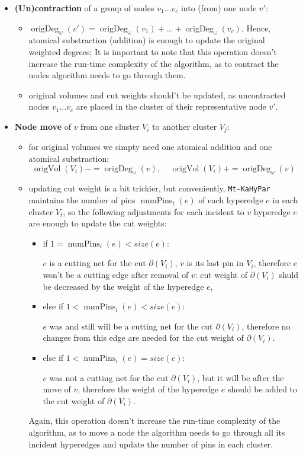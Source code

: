 \documentclass[acmsmall,nonacm,screen,review]{acmart}
\DeclareMathOperator{\origVol}{origVol}
\DeclareMathOperator{\origDeg}{origDeg}
\DeclareMathOperator{\numPins}{numPins}
\begin{document}
\begin{itemize}
    \item \textbf{(Un)contraction} of a group of nodes $v_1 \dots v_c$ into (from) 
one node $v'$:
\begin{itemize}
    \item $\origDeg_\omega(v') = \origDeg_\omega(v_1) + \dots + \origDeg_\omega(v_c)$. 
Hence, atomical substraction (addition) is enough to update the original 
weighted degrees; It is important to note that this operation doesn't increase 
the run-time complexity of the algorithm, as to contract the nodes algorithm needs
to go through them.
    \item original volumes and cut weights 
should't be updated, as uncontracted nodes $v_1 \dots v_c$ are placed in the cluster 
of their representative node $v'$.
\end{itemize}
    \item \textbf{Node move} of $v$ from one cluster $V_i$ to another cluster $V_j$:
\begin{itemize}
    \item for original volumes we simpty need one atomical addition and one atomical
substraction:
\[\origVol(V_i) -= \origDeg_\omega(v), \ \ \ \ \ \origVol(V_i) += \origDeg_\omega(v)\]

    \item updating cut weight is a bit trickier, but conveniently, \texttt{Mt-KaHyPar}
maintains the number of pins $\numPins_t(e)$ of each hyperedge $e$ in each cluster $V_t$, 
so the following adjustments for each incident to $v$ hyperedge $e$ are enough to 
update the cut weights:
\begin{itemize}
    \item if $1 = \numPins_i(e) < size(e)$: 

$e$ is a cutting net for the cut $\partial(V_i)$, $v$ is its last pin in $V_i$, 
therefore $e$ won't be a cutting edge after removal of $v$: cut weight of 
$\partial(V_i)$ shuld be decreased by the weight of the hyperedge $e$,

    \item else if $1 < \numPins_i(e) < size(e)$:

$e$ was and still will be a cutting net for the cut $\partial(V_i)$, 
therefore no changes from this edge are needed for the cut weight of $\partial(V_i)$.

    \item else if $1 < \numPins_i(e) = size(e)$:

$e$ was not a cutting net for the cut $\partial(V_i)$, but it will be after the move 
of $v$, therefore the weight of the hyperedge $e$ should be added to the cut 
weight of $\partial(V_i)$.
\end{itemize}
Again, this operation doesn't increase the run-time complexity of the algorithm,
as to move a node the algorithm needs to go through all its incident hyperedges and
update the number of pins in each cluster.

\end{itemize}
\end{itemize}
\end{document}
